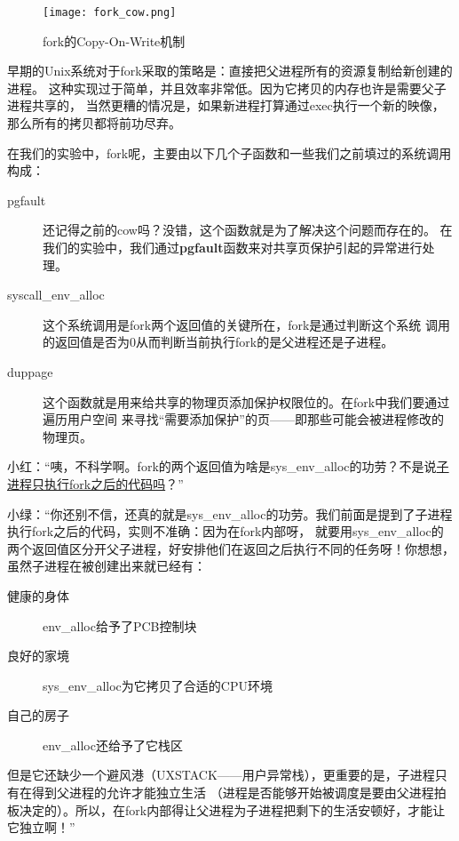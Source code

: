 \begin{figure}[htbp]
  \centering
  \texttt{[image: fork\_cow.png]}
  \caption{fork的Copy-On-Write机制}\label{fig:fork_cow} 
\end{figure}

\begin{note}
早期的Unix系统对于fork采取的策略是：直接把父进程所有的资源复制给新创建的进程。
这种实现过于简单，并且效率非常低。因为它拷贝的内存也许是需要父子进程共享的，
当然更糟的情况是，如果新进程打算通过exec执行一个新的映像，那么所有的拷贝都将前功尽弃。
\end{note}

在我们的实验中，fork呢，主要由以下几个子函数和一些我们之前填过的系统调用构成：
\begin{description}
 \item [pgfault] 还记得之前的cow吗？没错，这个函数就是为了解决这个问题而存在的。
 在我们的实验中，我们通过\textbf{pgfault}函数来对共享页保护引起的异常进行处理。
 \item [syscall\_env\_alloc] 这个系统调用是fork两个返回值的关键所在，fork是通过判断这个系统
 调用的返回值是否为0从而判断当前执行fork的是父进程还是子进程。
 \item [duppage] 这个函数就是用来给共享的物理页添加保护权限位的。在fork中我们要通过遍历用户空间
 来寻找“需要添加保护”的页——即那些可能会被进程修改的物理页。
\end{description}

\label{fork区分父子进程}
小红：“咦，不科学啊。fork的两个返回值为啥是sys\_env\_alloc的功劳？不是说\hyperref[fork与子进程]{子进程只执行fork之后的代码吗}？”

小绿：“你还别不信，还真的就是sys\_env\_alloc的功劳。我们前面是提到了子进程执行fork之后的代码，实则不准确：因为在fork内部呀，
就要用sys\_env\_alloc的两个返回值区分开父子进程，好安排他们在返回之后执行不同的任务呀！你想想，虽然子进程在被创建出来就已经有：
\begin{description}
 \item [健康的身体]  env\_alloc给予了PCB控制块
 \item [良好的家境]  sys\_env\_alloc为它拷贝了合适的CPU环境
 \item [自己的房子]  env\_alloc还给予了它栈区
\end{description}
\label{父爱如山}
但是它还缺少一个避风港（UXSTACK——用户异常栈），更重要的是，子进程只有在得到父进程的允许才能独立生活
（进程是否能够开始被调度是要由父进程拍板决定的）。所以，在fork内部得让父进程为子进程把剩下的生活安顿好，才能让它独立啊！”

